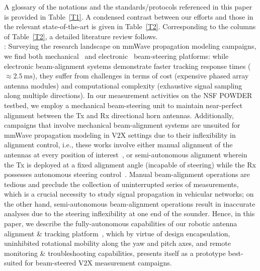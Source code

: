 \documentclass[12pt, draftcls, onecolumn]{IEEEtran}
\begin{document}
A glossary of the notations and the standards/protocols referenced in this paper is provided in Table~\ref{T1}. A condensed contrast between our efforts and those in the relevant state-of-the-art is given in Table~\ref{T2}. Corresponding to the columns of Table~\ref{T2}, a detailed literature review follows.\\
: Surveying the research landscape on mmWave propagation modeling campaigns, we find both mechanical~\cite{Purdue, Foliage, Harvard, SpatialConsistencyOriginal, SpatialDynamics, SuburbanGeometryJournal, FoliageSimulations, QDC_NIST, D2DHumanBlockage, V2XBlockages, MacCartneyUrbanHumanBlockage} and electronic~\cite{AgileLink, Outdoor28G, DigitalDivide} beam-steering platforms: while electronic beam-alignment systems demonstrate faster tracking response times (${\approx}\SI{2.5}{\milli\second}$), they suffer from challenges in terms of cost (expensive phased array antenna modules) and computational complexity (exhaustive signal sampling along multiple directions). In our measurement activities on the NSF POWDER testbed, we employ a mechanical beam-steering unit to maintain near-perfect alignment between the Tx and Rx directional horn antennas. Additionally, campaigns that involve mechanical beam-alignment systems are unsuited for mmWave propagation modeling in V$2$X settings due to their inflexibility in alignment control, i.e., these works involve either manual alignment of the antennas at every position of interest~\cite{Purdue, Harvard, SpatialConsistencyOriginal, SpatialDynamics, SuburbanGeometryJournal, QDC_NIST, D2DHumanBlockage, MacCartneyUrbanHumanBlockage}, or semi-autonomous alignment wherein the Tx is deployed at a fixed alignment angle (incapable of steering) while the Rx possesses autonomous steering control~\cite{Foliage, FoliageSimulations, PDAPs, V2XBlockages}. Manual beam-alignment operations are tedious and preclude the collection of uninterrupted series of measurements, which is a crucial necessity to study signal propagation in vehicular networks; on the other hand, semi-autonomous beam-alignment operations result in inaccurate analyses due to the steering inflexibility at one end of the sounder. Hence, in this paper, we describe the fully-autonomous capabilities of our robotic antenna alignment \& tracking platform~\cite{SPAVE_ICC}, which by virtue of design encapsulation, uninhibited rotational mobility along the yaw and pitch axes, and remote monitoring \& troubleshooting capabilities, presents itself as a prototype best-suited for beam-steered V$2$X measurement campaigns.
\end{document}
